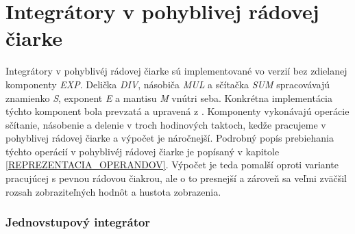 

\section{Integrátory v pohyblivej rádovej čiarke}
Integrátory v pohyblivéj rádovej čiarke sú implementované vo verzií bez zdielanej komponenty \textit{EXP}. Delička \textit{DIV}, násobiča \textit{MUL} a sčítačka \textit{SUM} spracovávajú znamienko \textit{S}, exponent \textit{E} a mantisu \textit{M} vnútri seba. Konkrétna implementácia týchto komponent bola prevzatá a upravená z \cite{Guide}.  
Komponenty vykonávajú operácie sčítanie, násobenie a delenie v troch hodinových taktoch, kedže pracujeme v pohyblivej rádovej čiarke a výpočet je náročnejší. Podrobný popís prebiehania týchto operácií v pohyblivéj rádovej čiarke je popísaný v kapitole \ref{REPREZENTACIA_OPERANDOV}. Výpočet je teda pomalší oproti variante pracujúcej s pevnou rádovou čiakrou, ale o to presnejší a zároveň sa veľmi zväčšil rozsah zobraziteľných hodnôt a hustota zobrazenia.


\subsubsection*{Jednovstupový integrátor}

